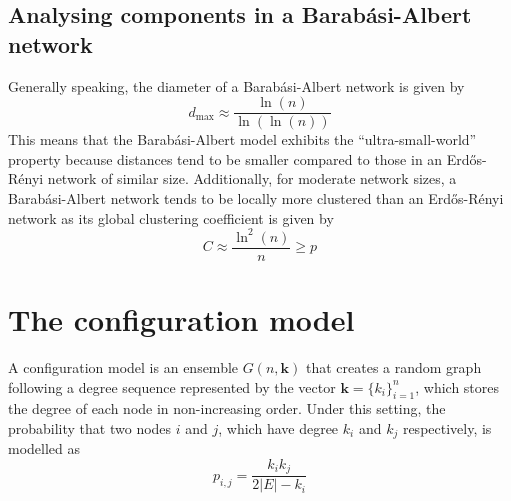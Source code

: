 \documentclass{report}
\begin{document}
\subsection{Analysing components in a Barabási-Albert network}
Generally speaking, the diameter of a Barabási-Albert network is given by
\[d_{\max} \approx \frac{\ln(n)}{\ln(\ln(n))}\]
This means that the Barabási-Albert model exhibits the ``ultra-small-world'' property because distances tend to be smaller compared to those in an Erdős-Rényi network of similar size. \newline
Additionally, for moderate network sizes, a Barabási-Albert network tends to be locally more clustered than an Erdős-Rényi network as its global clustering coefficient is given by
\[C \approx \frac{\ln^2(n)}{n} \ge p\]
\section{The configuration model}
A configuration model is an ensemble $\displaystyle G(n, \mathbf{k})$ that creates a random graph following a degree sequence represented by the vector $\displaystyle \mathbf{k} = \{k_i\}_{i = 1}^n$, which stores the degree of each node in non-increasing order. \newline
Under this setting, the probability that two nodes $\displaystyle i$ and $\displaystyle j$, which have degree $\displaystyle k_i$ and $\displaystyle k_j$ respectively, is modelled as
\[p_{i, j} = \frac{k_ik_j}{2|E| - k_i}\]
\end{document}
